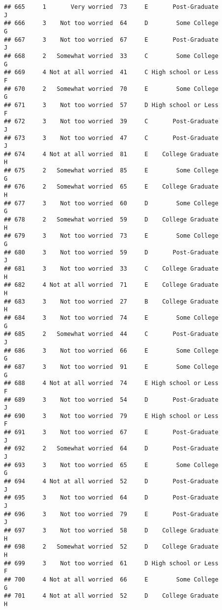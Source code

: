 \documentclass[
]{article}
\begin{document}
\begin{verbatim}
## 665     1       Very worried  73     E       Post-Graduate         J
## 666     3    Not too worried  64     D        Some College         G
## 667     3    Not too worried  67     E       Post-Graduate         J
## 668     2   Somewhat worried  33     C        Some College         G
## 669     4 Not at all worried  41     C High school or Less         F
## 670     2   Somewhat worried  70     E        Some College         G
## 671     3    Not too worried  57     D High school or Less         F
## 672     3    Not too worried  39     C       Post-Graduate         J
## 673     3    Not too worried  47     C       Post-Graduate         J
## 674     4 Not at all worried  81     E    College Graduate         H
## 675     2   Somewhat worried  85     E        Some College         G
## 676     2   Somewhat worried  65     E    College Graduate         H
## 677     3    Not too worried  60     D        Some College         G
## 678     2   Somewhat worried  59     D    College Graduate         H
## 679     3    Not too worried  73     E        Some College         G
## 680     3    Not too worried  59     D       Post-Graduate         J
## 681     3    Not too worried  33     C    College Graduate         H
## 682     4 Not at all worried  71     E    College Graduate         H
## 683     3    Not too worried  27     B    College Graduate         H
## 684     3    Not too worried  74     E        Some College         G
## 685     2   Somewhat worried  44     C       Post-Graduate         J
## 686     3    Not too worried  66     E        Some College         G
## 687     3    Not too worried  91     E        Some College         G
## 688     4 Not at all worried  74     E High school or Less         F
## 689     3    Not too worried  54     D       Post-Graduate         J
## 690     3    Not too worried  79     E High school or Less         F
## 691     3    Not too worried  67     E       Post-Graduate         J
## 692     2   Somewhat worried  64     D       Post-Graduate         J
## 693     3    Not too worried  65     E        Some College         G
## 694     4 Not at all worried  52     D       Post-Graduate         J
## 695     3    Not too worried  64     D       Post-Graduate         J
## 696     3    Not too worried  79     E       Post-Graduate         J
## 697     3    Not too worried  58     D    College Graduate         H
## 698     2   Somewhat worried  52     D    College Graduate         H
## 699     3    Not too worried  61     D High school or Less         F
## 700     4 Not at all worried  66     E        Some College         G
## 701     4 Not at all worried  52     D    College Graduate         H

\end{verbatim}
\end{document}
